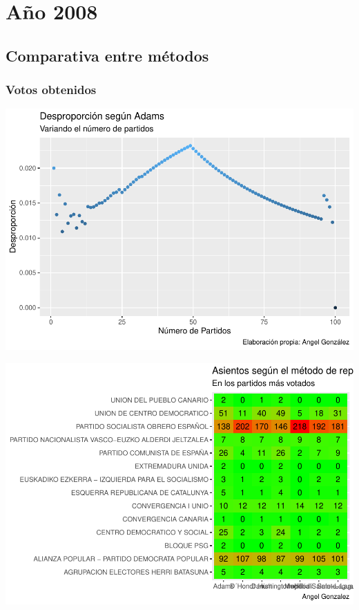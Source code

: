 \documentclass[12pt,a4paper,]{book}
\numberwithin{dummy}{section}
\theoremstyle{ocrenumbox}
\theoremstyle{blacknumex}
\theoremstyle{blacknumbox}
\theoremstyle{ocrenum}
\theoremstyle{ocrenum}
\begin{document}
\hypertarget{auxf1o-2008}{%
\section{Año 2008}\label{auxf1o-2008}}

\hypertarget{comparativa-entre-muxe9todos-9}{%
\subsection{Comparativa entre
métodos}\label{comparativa-entre-muxe9todos-9}}

\hypertarget{votos-obtenidos-9}{%
\subsubsection{Votos obtenidos}\label{votos-obtenidos-9}}

\begin{center}\includegraphics[width=1\linewidth]{figurasR/unnamed-chunk-32-1} \end{center}

\begin{center}\includegraphics[width=1\linewidth]{figurasR/unnamed-chunk-32-2} \end{center}
\end{document}
